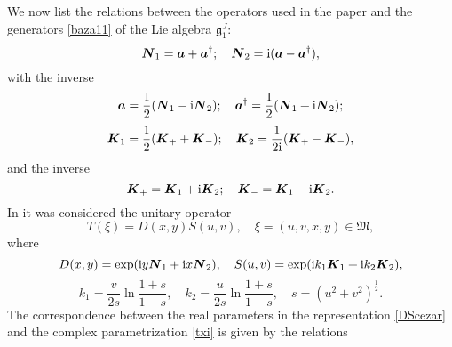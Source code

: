 \documentclass[12pt]{amsart}
\numberwithin{equation}{section}
\theoremstyle{definition}
\begin{document}
We now list the relations between the operators used in the paper
\cite{cezar}  and the generators \eqref{baza11} of the Lie algebra ${{\mathfrak{{g}}}}^J_1$: 
\begin{equation}\label{n1n2}{{\mbox{\boldmath{${N}$}}}}_1={{\mbox{\boldmath{${a}$}}}}+{{\mbox{\boldmath{${a}$}}}}^{\dagger};\quad{{\mbox{\boldmath{${N}$}}}}_2={\operatorname{i}} ({{\mbox{\boldmath{${a}$}}}}-{{\mbox{\boldmath{${a}$}}}}^{\dagger}),
\end{equation}
with  the inverse
\begin{equation}
{{\mbox{\boldmath{${a}$}}}}=\frac{1}{2}({{\mbox{\boldmath{${N}$}}}}_1-{\operatorname{i}} {{\mbox{\boldmath{${N}$}}}}_2); \quad {{\mbox{\boldmath{${a}$}}}}^{\dagger}=\frac{1}{2}({{\mbox{\boldmath{${N}$}}}}_1+{\operatorname{i}} {{\mbox{\boldmath{${N}$}}}}_2);
\end{equation}
\begin{equation}\label{k1k2}
{{\mbox{\boldmath{${K}$}}}}_1=\frac{1}{2}({{\mbox{\boldmath{${K}$}}}}_++{{\mbox{\boldmath{${K}$}}}}_-); \quad {{\mbox{\boldmath{${K}$}}}}_2=\frac{1}{2{\operatorname{i}}}({{\mbox{\boldmath{${K}$}}}}_+-{{\mbox{\boldmath{${K}$}}}}_-),
\end{equation}
and the inverse
\begin{equation}
{{\mbox{\boldmath{${K}$}}}}_+={{\mbox{\boldmath{${K}$}}}}_1+{\operatorname{i}}{{\mbox{\boldmath{${K}$}}}}_2;\quad {{\mbox{\boldmath{${K}$}}}}_-={{\mbox{\boldmath{${K}$}}}}_1-{\operatorname{i}}{{\mbox{\boldmath{${K}$}}}}_2.
\end{equation}
In \cite{cezar} it was considered the unitary operator
\begin{equation}\label{TCEZ}
T(\xi)=D(x,y)S(u,v),\quad \xi=(u,v,x,y)\in{{\mathfrak{{M}}}},
\end{equation}
where
\begin{equation}\label{DScezar}
D(x,y)=\exp({\operatorname{i}} y{{\mbox{\boldmath{${N}$}}}}_1+{\operatorname{i}} x{{\mbox{\boldmath{${N}$}}}}_2), \quad S(u,v)=\exp({\operatorname{i}} k_1{{\mbox{\boldmath{${K}$}}}}_1 +{\operatorname{i}} k_2{{\mbox{\boldmath{${K}$}}}}_2),
\end{equation}
\begin{equation}\label{KK12}
k_1=\frac{v}{2s}\ln\frac{1+s}{1-s}, \quad k_2=\frac{u}{2s}\ln\frac{1+s}{1-s},\quad s=(u^2+v^2)^{\frac{1}{2}} .
\end{equation}
The correspondence between the real parameters in the representation \eqref{DScezar} and the complex parametrization \eqref{txi} is given by the relations
\end{document}
